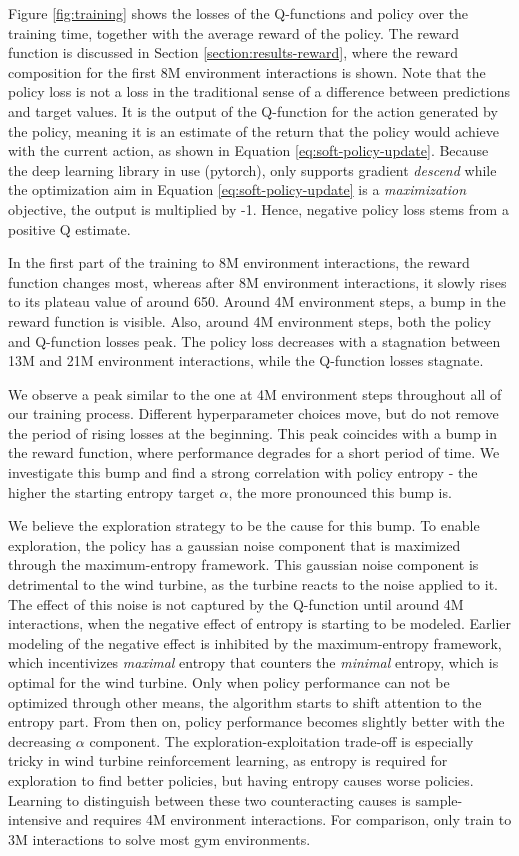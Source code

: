 Figure \ref{fig:training} shows the losses of the Q-functions and policy over the training time, together with the average reward of the policy. The reward function is discussed in Section \ref{section:results-reward}, where the reward composition for the first 8M environment interactions is shown. Note that the policy loss is not a loss in the traditional sense of a difference between predictions and target values. It is the output of the Q-function for the action generated by the policy, meaning it is an estimate of the return that the policy would achieve with the current action, as shown in Equation \ref{eq:soft-policy-update}. Because the deep learning library in use (pytorch), only supports gradient \textit{descend} while the optimization aim in Equation \ref{eq:soft-policy-update} is a \textit{maximization} objective, the output is multiplied by -1. Hence, negative policy loss stems from a positive Q estimate.

In the first part of the training to 8M environment interactions, the reward function changes most, whereas after 8M environment interactions, it slowly rises to its plateau value of around 650. Around 4M environment steps, a bump in the reward function is visible. Also, around 4M environment steps, both the policy and Q-function losses peak. The policy loss decreases with a stagnation between 13M and 21M environment interactions, while the Q-function losses stagnate.

We observe a peak similar to the one at 4M environment steps throughout all of our training process. Different hyperparameter choices move, but do not remove the period of rising losses at the beginning. This peak coincides with a bump in the reward function, where performance degrades for a short period of time. We investigate this bump and find a strong correlation with policy entropy - the higher the starting entropy target $\alpha$, the more pronounced this bump is.

We believe the exploration strategy to be the cause for this bump. To enable exploration, the policy has a gaussian noise component that is maximized through the maximum-entropy framework. This gaussian noise component is detrimental to the wind turbine, as the turbine reacts to the noise applied to it. The effect of this noise is not captured by the Q-function until around 4M interactions, when the negative effect of entropy is starting to be modeled. Earlier modeling of the negative effect is inhibited by the maximum-entropy framework, which incentivizes \textit{maximal} entropy that counters the \textit{minimal} entropy, which is optimal for the wind turbine. Only when policy performance can not be optimized through other means, the algorithm starts to shift attention to the entropy part. From then on, policy performance becomes slightly better with the decreasing $\alpha$ component. The exploration-exploitation trade-off is especially tricky in wind turbine reinforcement learning, as entropy is required for exploration to find better policies, but having entropy causes worse policies. Learning to distinguish between these two counteracting causes is sample-intensive and requires 4M environment interactions. For comparison, \citet{haarnojaSoftActorCriticOffPolicy2018} only train to 3M interactions to solve most gym environments.

